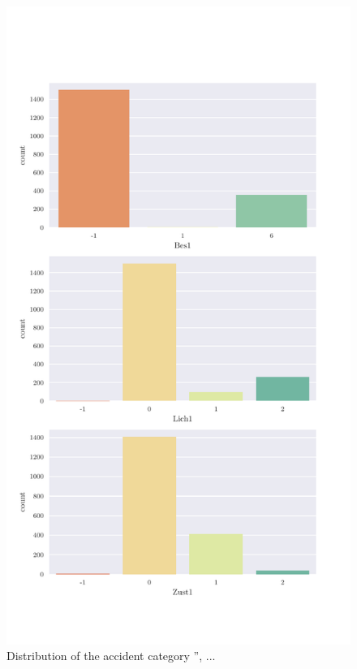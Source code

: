 \documentclass[a4paper,headsepline,footsepline,fontsize=11pt,BCOR=12mm,DIV=12]{report}
\begin{document}
\begin{appendices}
\begin{figure}[h]
	\centering
	\includegraphics[scale=0.7]{../CorrAnalysis/data/BAYSIS/03_selected_01_startJam/plots/baysis_selected_count_multiple04}
	\caption{Distribution of the accident category '', ...}
	\label{img:appendix_baysis_selected_01_04}
\end{figure}


\end{appendices}
\end{document}
